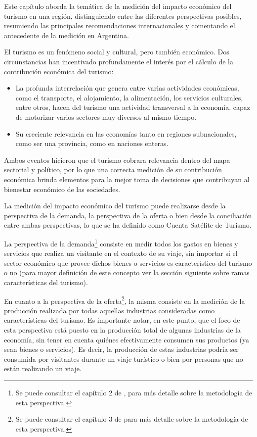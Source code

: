 \documentclass[
  openany]{book}
\begin{document}
Este capítulo aborda la temática de la medición del impacto económico del turismo en una región, distinguiendo entre las diferentes perspectivas posibles, resumiendo las principales recomendaciones internacionales y comentando el antecedente de la medición en Argentina.

El turismo es un fenómeno social y cultural, pero también económico. Dos circunstancias han incentivado profundamente el interés por el cálculo de la contribución económica del turismo:

\begin{itemize}
\item
  La profunda interrelación que genera entre varias actividades económicas, como el transporte, el alojamiento, la alimentación, los servicios culturales, entre otros, hacen del turismo una actividad transversal a la economía, capaz de motorizar varios sectores muy diversos al mismo tiempo.
\item
  Su creciente relevancia en las economías tanto en regiones subnacionales, como ser una provincia, como en naciones enteras.
\end{itemize}

Ambos eventos hicieron que el turismo cobrara relevancia dentro del mapa sectorial y político, por lo que una correcta medición de su contribución económica brinda elementos para la mejor toma de decisiones que contribuyan al bienestar económico de las sociedades.

La medición del impacto económico del turismo puede realizarse desde la perspectiva de la demanda, la perspectiva de la oferta o bien desde la conciliación entre ambas perspectivas, lo que se ha definido como Cuenta Satélite de Turismo.

La perspectiva de la demanda\footnote{Se puede consultar el capítulo 2 de \citet{cstrmc2008}, para más detalle sobre la metodología de esta perspectiva.} consiste en medir todos los gastos en bienes y servicios que realiza un visitante en el contexto de su viaje, sin importar si el sector económico que provee dichos bienes o servicios es característico del turismo o no (para mayor definición de este concepto ver la sección siguiente sobre ramas características del turismo).

En cuanto a la perspectiva de la oferta\footnote{Se puede consultar el capítulo 3 de \citet{cstrmc2008} para más detalle sobre la metodología de esta perspectiva.}, la misma consiste en la medición de la producción realizada por todas aquellas industrias consideradas como características del turismo. Es importante notar, en este punto, que el foco de esta perspectiva está puesto en la producción total de algunas industrias de la economía, sin tener en cuenta quiénes efectivamente consumen sus productos (ya sean bienes o servicios). Es decir, la producción de estas industrias podría ser consumida por visitantes durante un viaje turístico o bien por personas que no están realizando un viaje.
\end{document}
